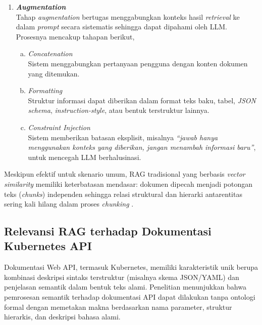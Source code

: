 \begin{enumerate}
    \item \textbf{\textit{Augmentation}}\\
    Tahap \textit{augmentation} bertugas menggabungkan konteks hasil \textit{retrieval} ke dalam \textit{prompt} secara sistematis sehingga dapat dipahami oleh LLM. Prosesnya mencakup tahapan berikut,
    \begin{enumerate}[a.]
        \item \textit{Concatenation} \\
        Sistem menggabungkan pertanyaan pengguna dengan konten dokumen yang ditemukan.
        \item \textit{Formatting} \\
        Struktur informasi dapat diberikan dalam format teks baku, tabel, \textit{JSON schema}, \textit{instruction-style}, atau bentuk terstruktur lainnya.
        \item \textit{Constraint Injection} \\
        Sistem memberikan batasan eksplisit, misalnya \textit{``jawab hanya menggunakan konteks yang diberikan, jangan menambah informasi baru''}, untuk mencegah LLM berhalusinasi.
    \end{enumerate}
\end{enumerate}

Meskipun efektif untuk skenario umum, RAG tradisional yang berbasis \textit{vector similarity} memiliki keterbatasan mendasar: dokumen dipecah menjadi potongan teks (\textit{chunks}) independen sehingga relasi struktural dan hierarki antarentitas sering kali hilang dalam proses \textit{chunking} \parencite{rag_survey}.

\subsection{Relevansi RAG terhadap Dokumentasi Kubernetes API}

Dokumentasi Web API, termasuk Kubernetes, memiliki karakteristik unik berupa kombinasi deskripsi sintaks terstruktur (misalnya skema JSON/YAML) dan penjelasan semantik dalam bentuk teks alami. Penelitian \textcite{kotstein_restberta_2024} menunjukkan bahwa pemrosesan semantik terhadap dokumentasi API dapat dilakukan tanpa ontologi formal dengan memetakan makna berdasarkan nama parameter, struktur hierarkis, dan deskripsi bahasa alami.

